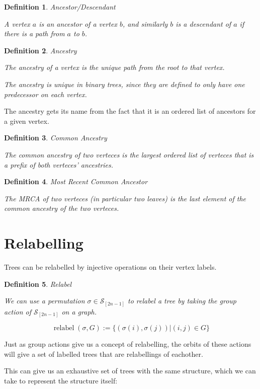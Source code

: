 \documentclass[10pt,a4paper]{report}
\DeclareMathOperator{\relabel}{relabel}
\newcommand{\S}{\mathcal{S}}
\newtheorem{definition}{Definition}
\begin{document}
\begin{definition} Ancestor/Descendant

	A vertex $a$ is an ancestor of a vertex $b$, and similarly $b$ is a
	descendant of $a$ if there is a path from $a$ to $b$.
\end{definition}

\begin{definition} Ancestry

	The ancestry of a vertex is the unique path from the root to that vertex.

	The ancestry is unique in binary trees, since they are defined to only have
	one predecessor on each vertex.
\end{definition}

The ancestry gets its name from the fact that it is an ordered list of
ancestors for a given vertex.

\begin{definition} Common Ancestry

	The common ancestry of two verteces is the largest ordered list of verteces
	that is a prefix of both verteces' ancestries.
\end{definition}

\begin{definition} Most Recent Common Ancestor

	The MRCA of two verteces (in particular two leaves) is the last element of
	the common ancestry of the two verteces.
\end{definition}

\section{Relabelling}

Trees can be relabelled by injective operations on their vertex labels.

\begin{definition} Relabel

	We can use a permutation $\sigma \in \S_[2n-1]$ to relabel a tree by taking
	the group action of $\S_[2n-1]$ on a graph.

	\[
		\relabel(\sigma, G) := \{(\sigma(i), \sigma(j)) | (i, j) \in G\}
	\]
\end{definition}

Just as group actions give us a concept of relabelling, the orbits of these
actions will give a set of labelled trees that are relabellings of eachother.

This can give us an exhaustive set of trees with the same structure, which we
can take to represent the structure itself:
\end{document}

